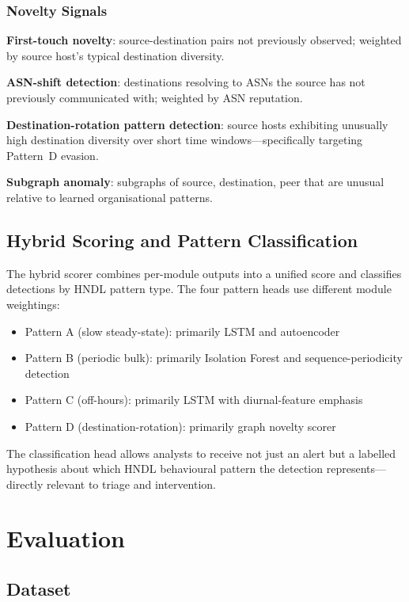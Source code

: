 \documentclass[sigconf,nonacm]{acmart}
\begin{document}
\subsubsection{Novelty Signals}

\textbf{First-touch novelty}: source-destination pairs not previously
observed; weighted by source host's typical destination diversity.

\textbf{ASN-shift detection}: destinations resolving to ASNs the
source has not previously communicated with; weighted by ASN
reputation.

\textbf{Destination-rotation pattern detection}: source hosts
exhibiting unusually high destination diversity over short time
windows---specifically targeting Pattern~D evasion.

\textbf{Subgraph anomaly}: subgraphs of {source, destination, peer}
that are unusual relative to learned organisational patterns.

\subsection{Hybrid Scoring and Pattern Classification}

The hybrid scorer combines per-module outputs into a unified score
and classifies detections by HNDL pattern type. The four pattern
heads use different module weightings:

\begin{itemize}
  \item Pattern A (slow steady-state): primarily LSTM and autoencoder
  \item Pattern B (periodic bulk): primarily Isolation Forest and
        sequence-periodicity detection
  \item Pattern C (off-hours): primarily LSTM with diurnal-feature
        emphasis
  \item Pattern D (destination-rotation): primarily graph novelty
        scorer
\end{itemize}

The classification head allows analysts to receive not just an alert
but a labelled hypothesis about which HNDL behavioural pattern the
detection represents---directly relevant to triage and intervention.

\section{Evaluation}

\subsection{Dataset}
\end{document}
